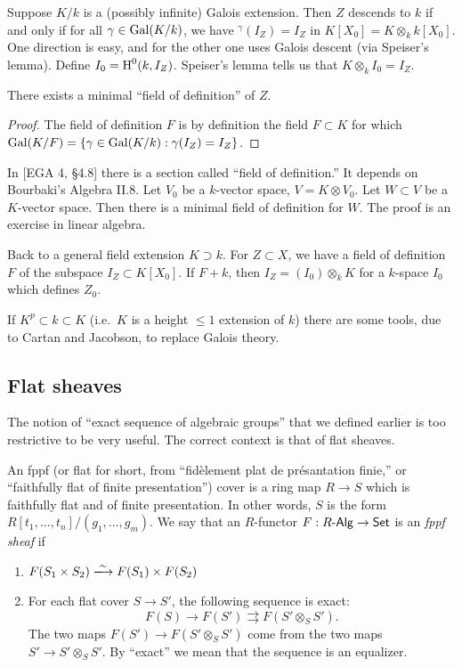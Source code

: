 \documentclass{article}
\begin{document}
Suppose $K/k$ is a (possibly infinite) Galois extension. Then $Z$ descends to 
$k$ if and only if for all $\gamma\in \operatorname{Gal}(K/k)$, we have 
$^\gamma(I_Z) = I_Z$ in $K[X_0] = K\otimes_k k[X_0]$. One direction is easy, 
and for the other one uses Galois descent (via Speiser's lemma). Define 
$I_0=\operatorname{H}^0(k, I_Z)$. Speiser's lemma tells us that $K\otimes_k I_0 = I_Z$. 

\begin{corollary}
There exists a minimal ``field of definition'' of $Z$.
\end{corollary}
\begin{proof}
The field of definition $F$ is by definition the field $F\subset K$ for which 
$\operatorname{Gal}(K/F)=\{\gamma\in \operatorname{Gal}(K/k):\gamma(I_Z)=I_Z\}$. 
\end{proof}

In [EGA 4, \S 4.8] there is a section called ``field of definition.'' It 
depends on Bourbaki's Algebra II.8. Let $V_0$ be a $k$-vector space, 
$V=K\otimes V_0$. Let $W\subset V$ be a $K$-vector space. Then there is a 
minimal field of definition for $W$. The proof is an exercise in linear 
algebra. 

Back to a general field extension $K\supset k$. For $Z\subset X$, we have 
a field of definition $F$ of the subspace $I_Z\subset K[X_0]$. If $F+k$, 
then $I_Z=(I_0)\otimes_k K$ for a $k$-space $I_0$ which defines $Z_0$. 

If $K^p\subset k\subset K$ (i.e.~$K$ is a height $\leqslant 1$ extension of 
$k$) there are some tools, due to Cartan and Jacobson, to replace Galois theory. 


\subsection{Flat sheaves}

The notion of ``exact sequence of algebraic groups'' that we defined earlier is 
too restrictive to be very useful. The correct context is that of flat 
sheaves. 


An fppf (or flat for short, from ``fid\`element plat de pr\'esantation finie,'' or 
``faithfully flat of finite presentation'') cover is a ring map $R\to S$ which 
is faithfully flat and of finite presentation. In other words, $S$ is the 
form $R[t_1,\dots,t_n] / (g_1,\dots,g_m)$. We say that an $R$-functor 
$F:R\text{-}\mathsf{Alg}\to \mathsf{Set}$ is an \emph{fppf sheaf} if 
\begin{enumerate}
  \item $F(S_1\times S_2)\isomorphism F(S_1)\times F(S_2)$ 
  \item For each flat cover $S\to S'$, the following sequence is exact: 
    \[
      F(S) \to F(S') \rightrightarrows F(S'\otimes_S S') .
    \]
    The two maps $F(S') \to F(S'\otimes_S S')$ come from the two 
    maps $S'\to S'\otimes_S S'$. By ``exact'' we mean that the sequence is 
    an equalizer. 
\end{enumerate}
\end{document}
